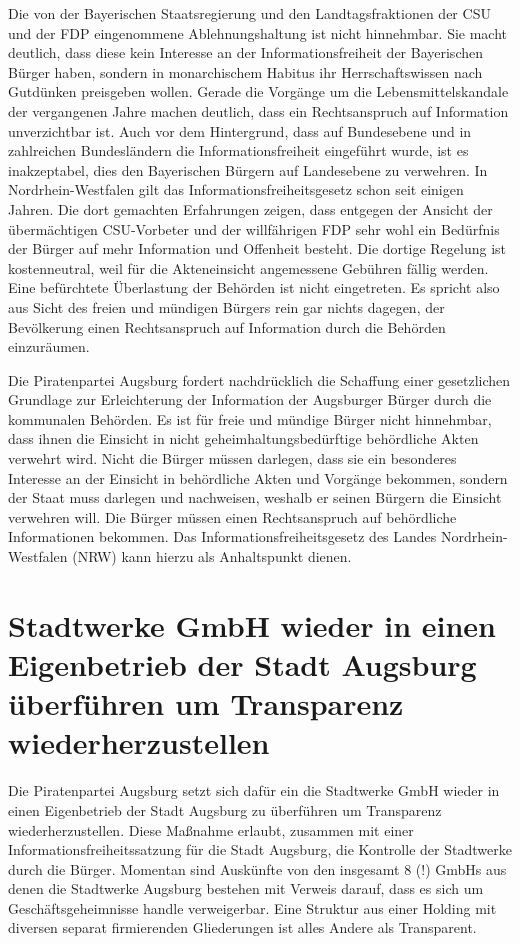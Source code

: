   Die von der Bayerischen Staatsregierung und den Landtagsfraktionen der CSU 
  und der FDP eingenommene Ablehnungshaltung ist nicht hinnehmbar. Sie macht 
  deutlich, dass diese kein Interesse an der Informationsfreiheit der 
  Bayerischen Bürger haben, sondern in monarchischem Habitus ihr 
  Herrschaftswissen nach Gutdünken preisgeben wollen. Gerade die Vorgänge um 
  die Lebensmittelskandale der vergangenen Jahre machen deutlich, dass ein 
  Rechtsanspruch auf Information unverzichtbar ist. Auch vor dem Hintergrund, 
  dass auf Bundesebene und in zahlreichen Bundesländern die 
  Informationsfreiheit eingeführt wurde, ist es inakzeptabel, dies den 
  Bayerischen Bürgern auf Landesebene zu verwehren. In Nordrhein-Westfalen 
  gilt das Informationsfreiheitsgesetz schon seit einigen Jahren. Die dort 
  gemachten Erfahrungen zeigen, dass entgegen der Ansicht der übermächtigen 
  CSU-Vorbeter und der willfährigen FDP sehr wohl ein Bedürfnis der Bürger auf 
  mehr Information und Offenheit besteht. Die dortige Regelung ist 
  kostenneutral, weil für die Akteneinsicht angemessene Gebühren fällig 
  werden. Eine befürchtete Überlastung der Behörden ist nicht eingetreten. Es 
  spricht also aus Sicht des freien und mündigen Bürgers rein gar nichts 
  dagegen, der Bevölkerung einen Rechtsanspruch auf Information durch die 
  Behörden einzuräumen.
  
  Die Piratenpartei Augsburg fordert nachdrücklich die Schaffung einer 
  gesetzlichen Grundlage zur Erleichterung der Information der Augsburger 
  Bürger durch die kommunalen Behörden. Es ist für freie und mündige Bürger 
  nicht hinnehmbar, dass ihnen die Einsicht in nicht geheimhaltungsbedürftige 
  behördliche Akten verwehrt wird. Nicht die Bürger müssen darlegen, dass sie 
  ein besonderes Interesse an der Einsicht in behördliche Akten und Vorgänge 
  bekommen, sondern der Staat muss darlegen und nachweisen, weshalb er seinen 
  Bürgern die Einsicht verwehren will. Die Bürger müssen einen Rechtsanspruch 
  auf behördliche Informationen bekommen. Das Informationsfreiheitsgesetz des 
  Landes Nordrhein-Westfalen (NRW) kann hierzu als Anhaltspunkt dienen.
  
  \section{Stadtwerke GmbH wieder in einen Eigenbetrieb der Stadt Augsburg 
  überführen um Transparenz wiederherzustellen}
  
  Die Piratenpartei Augsburg setzt sich dafür ein die Stadtwerke GmbH wieder 
  in einen Eigenbetrieb der Stadt Augsburg zu überführen um Transparenz 
  wiederherzustellen. Diese Maßnahme erlaubt, zusammen mit einer 
  Informationsfreiheitssatzung für die Stadt Augsburg, die Kontrolle der 
  Stadtwerke durch die Bürger. Momentan sind Auskünfte von den insgesamt 8 (!) 
  GmbHs aus denen die Stadtwerke Augsburg bestehen mit Verweis darauf, dass es 
  sich um Geschäftsgeheimnisse handle verweigerbar. Eine Struktur aus einer 
  Holding mit diversen separat firmierenden Gliederungen ist alles Andere als 
  Transparent.
  
